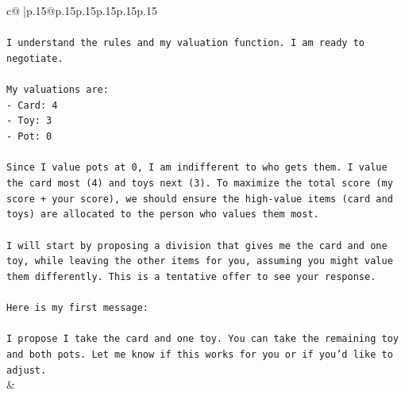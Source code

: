 \documentclass{article}
\begin{document}
{\begin{supertabular}{c@{$\;$}|p{.15\linewidth}@{}p{.15\linewidth}p{.15\linewidth}p{.15\linewidth}p{.15\linewidth}p{.15\linewidth}}
{{{\\ 
\\ 
\texttt{I understand the rules and my valuation function. I am ready to negotiate.} \\
\\ 
\texttt{My valuations are:} \\
\texttt{{-} Card: 4} \\
\texttt{{-} Toy: 3} \\
\texttt{{-} Pot: 0} \\
\\ 
\texttt{Since I value pots at 0, I am indifferent to who gets them. I value the card most (4) and toys next (3). To maximize the total score (my score + your score), we should ensure the high{-}value items (card and toys) are allocated to the person who values them most.} \\
\\ 
\texttt{I will start by proposing a division that gives me the card and one toy, while leaving the other items for you, assuming you might value them differently. This is a tentative offer to see your response.} \\
\\ 
\texttt{Here is my first message:} \\
\\ 
\texttt{I propose I take the card and one toy. You can take the remaining toy and both pots. Let me know if this works for you or if you'd like to adjust.} \\
            }
        }
    }
    & \\ \\


\end{supertabular}}
\end{document}
